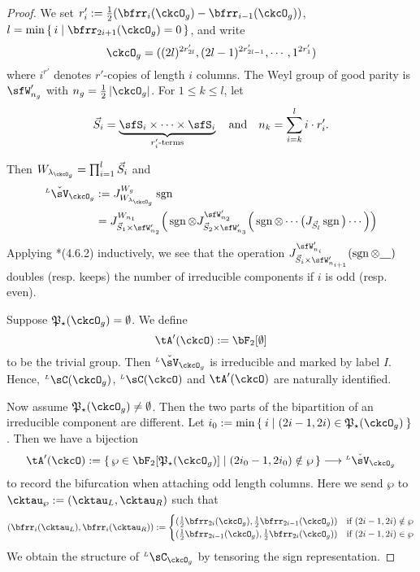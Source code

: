 \documentclass[12pt,a4paper]{amsart}
\def\abs#1{\left|{#1}\right|}
\newcommand{\sgn}{\operatorname{sgn}}
\numberwithin{equation}{section}
\theoremstyle{remark}
\def\half{{\tfrac{1}{2}}}
\def\lamckg{\lambda_{\ckcO_g}}
\def\LC{{}^{\scriptscriptstyle L}\sC}
\def\ckLV{{}^{\scriptscriptstyle L}\check\sV}
\def\AND{\quad \text{and} \quad}
\def\CPPs{\mathfrak{P}_{\star}}
\begin{document}
\begin{proof}
    We set $r'_{i} := \half(\bfrr_{i}(\ckcO_{g})-\bfrr_{i-1}(\ckcO_{g}))$,
    $l =\min\set{i|\bfrr_{2i+1}(\ckcO_{g})=0}$, and write
    \[
      \ckcO_{g} %
      = ((2l)^{2r'_{2l}}, (2l-1)^{2r'_{2l-1}},\cdots, 1^{2r'_{1}})
    \]
    where $i^{r'}$ denotes $r'$-copies of length $i$ columns.
    The Weyl group of good parity is $\sfW'_{n_{g}}$ with
    $n_{g} = \half\abs{\ckcO_{g}}$. For $1\leq k\leq l$, let
    \[
      \vec{S}_{i} = \underbrace{\sfS_{i}\times \cdots\times \sfS_{i}}_{r'_{i}\text{-terms}} \AND n_{k} = \sum_{i=k}^{l} i\cdot r'_{i}.
    \]

    Then $W_{\lamckg}=\prod_{i=1}^{l} \vec{S}_{i}$ and
    \[
      \begin{split}
        \ckLV_{\ckcO_{g}}& :=J_{W_{\lamckg}}^{\Wg}\sgn\\
        & = J_{\vec{S}_{1}\times \sfW'_{n_{2}}}^{W_{n_{1}}} \Big(\sgn \otimes J_{\vec{S}_{2}\times \sfW'_{n_{3}}}^{\sfW'_{n_{2}}}\Big(\sgn
        \otimes \cdots\big(J_{\vec{S}_{l}} \sgn\big)\cdots \Big)\Big) \\
      \end{split}
    \]
    Applying \cite{Lu}*{(4.6.2)} inductively, we see that the operation
    $J_{\vec{S}_{i}\times \sfW'_{n_{i+1}}}^{\sfW'_{n_{i}}}(\sgn \otimes \underline{\ \ \ })$
    doubles (resp. keeps) the number of irreducible components if $i$ is odd
    (resp. even).

    Suppose $\CPPs(\ckcO_{g}) = \emptyset$.
    We define
    \[
      \tA'(\ckcO):= \bF_{2}[\emptyset]
    \]
    to be the trivial group.
    Then $\ckLV_{\ckcO_{g}}$ is
    irreducible and marked by label $I$.  Hence, $\LC(\ckcO_{g})$,
    $\LC(\ckcO)$ and $\tA'(\ckcO)$ are naturally identified.


    Now assume $\CPPs(\ckcO_{g})\neq \emptyset$. Then the two parts of the
    bipartition of an irreducible component are different. Let
    $i_{0}:= \min\Set{i| (2i-1,2i)\in \CPPs(\ckcO_{g})}$.
    Then we have a bijection
    \[
      \tA'(\ckcO):= \set{\wp\in \bF_{2}[\CPPs(\ckcO_{g})]|(2i_{0}-1,2i_{0})\notin \wp} \longrightarrow \ckLV_{\ckcO_{g}}
    \]
    to record the bifurcation when attaching odd length columns. Here we send
    $\wp$ to $\cktau_{\wp}:= (\cktau_{L},\cktau_{R})$ such that
    \[
      (\bfrr_{i}(\cktau_{L}),\bfrr_{i}(\cktau_{R})) := \begin{cases} (\half\bfrr_{2i}(\ckcO_{g}),\half\bfrr_{2i-1}(\ckcO_{g}))
        & \text{if } (2i-1,2i)\notin \wp\\
        (\half\bfrr_{2i-1}(\ckcO_{g}),\half\bfrr_{2i}(\ckcO_{g}))
        & \text{if } (2i-1,2i)\in \wp\\
      \end{cases}
    \]
    We obtain the structure of $\LC_{\ckcO_{g}}$ by tensoring the sign
    representation.


\end{proof}
\end{document}
